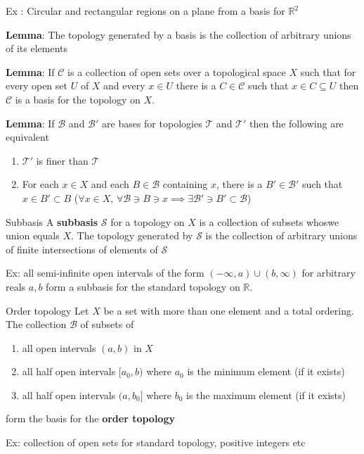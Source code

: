 \documentclass[titlepage, 12pt]{book}
\begin{document}
Ex : Circular and rectangular regions on a plane from a basis for $\mathbb{R}^2$

\textbf{Lemma}: The topology generated by a basis is the collection of arbitrary
unions of its elements

\textbf{Lemma}: If $\mathcal{C}$ is a collection of open sets over a topological
space $X$ such that for every open set $U$ of $X$ and every $x\in U$ there is a
$C\in\mathcal{C}$ such that $x\in C\subseteq U$ then $\mathcal{C}$ is a basis
for the topology on $X$.

\textbf{Lemma}: If $\mathcal{B}$ and $\mathcal{B}'$ are bases for topologies
$\mathcal{T}$ and $\mathcal{T}'$ then the following are equivalent
\begin{enumerate}
    \item $\mathcal{T}'$ is finer than $\mathcal{T}$
    \item For each $x\in X$ and each $B\in\mathcal{B}$ containing $x$, there is
        a $B'\in\mathcal{B}'$ such that $x\in B'\subset B$ ($\forall x\in X$,
        $\forall \mathcal{B}\ni B\ni x\implies \exists \mathcal{B}'\ni
        B'\subset\mathcal{B}$)
\end{enumerate}

\begin{definition}{Subbasis}{}
    A \textbf{subbasis} $\mathcal{S}$ for a topology on $X$ is a collection of
    subsets whoswe union equals $X$. The topology generated by $\mathcal{S}$ is
    the collection of arbitrary unions of finite intersections of elements of
    $\mathcal{S}$
\end{definition}
Ex: all semi-infinite open intervals of the form $(-\infty, a)\cup (b, \infty)$
for arbitrary reals $a, b$ form a subbasis for the standard topology on
$\mathbb{R}$.

\begin{definition}{Order topology}{}
    Let $X$ be a set with more than one element and a total ordering. The
    collection $\mathcal{B}$ of subsets of
    \begin{enumerate}
        \item all open intervals $(a, b)$ in $X$
        \item all half open intervals $[a_0, b)$ where $a_0$ is the minimum
            element (if it exists)
        \item all half open intervals $(a, b_0]$ where $b_0$ is the maximum
            element (if it exists)
    \end{enumerate}
    form the basis for the \textbf{order topology}
\end{definition}
Ex: collection of open sets for standard topology, positive integers etc
\end{document}
